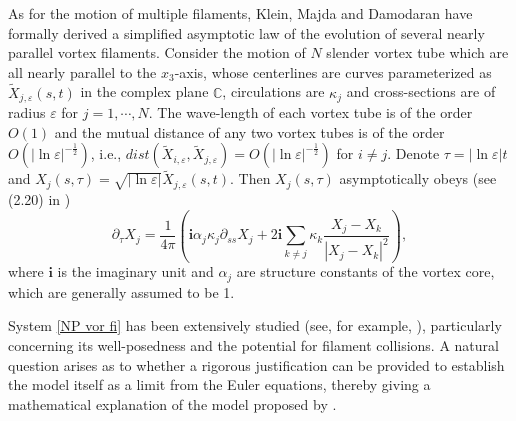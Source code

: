 \documentclass[12pt,reqno]{amsart}
\numberwithin{equation}{section}
\theoremstyle{definition}
\theoremstyle{remark}
\begin{document}
As for the motion of multiple filaments, Klein, Majda and Damodaran \cite{KMD} have formally derived a simplified asymptotic law
of the evolution of several  nearly parallel vortex filaments. Consider the motion of $ N $ slender vortex tube which are all nearly parallel to the $ x_3 $-axis, whose centerlines are curves parameterized as $ \tilde{X}_{j,\varepsilon}(s,t) $ in the complex plane $ \mathbb{C} $, circulations are $ \kappa_j $ and cross-sections are of radius $ \varepsilon $ for $ j=1,\cdots,N $. The wave-length of each vortex tube is of the order $ O(1) $ and the mutual distance of any two vortex tubes is of the order $ O\left (|\ln\varepsilon|^{-\frac{1}{2}}\right ) $, i.e., $ dist(\tilde{X}_{i,\varepsilon}, \tilde{X}_{j,\varepsilon}) =O\left (|\ln\varepsilon|^{-\frac{1}{2}}\right )$ for $ i\neq j $. Denote $   \tau=|\ln\varepsilon|t $ and $ X_j(s, \tau)=\sqrt{|\ln\varepsilon|}\tilde{X}_{j,\varepsilon}(s, t) $. Then $ X_j(s, \tau) $ asymptotically obeys  (see (2.20) in \cite{KMD})
\begin{equation}\label{NP vor fi} 
\partial_\tau X_j=\frac{1}{4\pi}\left(\mathbf{i}\alpha_j\kappa_j\partial_{ss}X_j+2\mathbf{i}\sum_{k\neq j}\kappa_k\frac{X_j-X_k}{|X_j-X_k|^2} \right),
\end{equation}
where $ \mathbf{i} $ is  the imaginary unit and $ \alpha_j $ are structure constants of the vortex core, which are generally assumed to be 1. 




System \eqref{NP vor fi} has been extensively studied  (see, for example, \cite{BM,BFM,CGY,KPV,KVG,LM}), particularly concerning its well-posedness and the potential for filament collisions. A natural question arises as to whether a rigorous justification can be provided to establish the model itself as a limit from  the Euler equations, thereby  giving a  mathematical explanation of the model proposed by \cite{KMD}.
\end{document}

